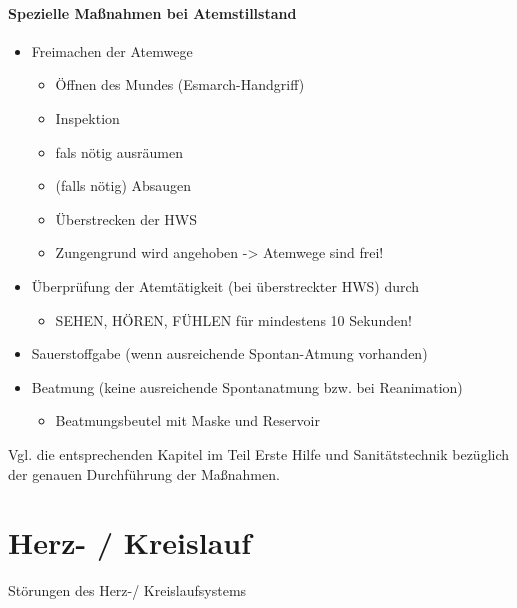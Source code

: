 \begin{gMassnahmenEnv}
    \paragraph{Spezielle Ma{\ss}nahmen bei Atemstillstand}

\begin{itemize}
    \item Freimachen der Atemwege
    \begin{itemize}
        \item \"Offnen des Mundes (Esmarch-Handgriff)
        \item Inspektion
        \item fals n\"otig ausr\"aumen
        \item (falls n\"otig) Absaugen
        \item \"Uberstrecken der HWS
        \item Zungengrund wird angehoben -{\textgreater} Atemwege  sind frei!
    \end{itemize}
    \item \"Uberpr\"ufung der Atemt\"atigkeit (bei  \"uberstreckter HWS)
    durch
    \begin{itemize}
        \item SEHEN, H\"OREN, F\"UHLEN f\"ur mindestens 10  Sekunden!
    \end{itemize}
    \item Sauerstoffgabe (wenn ausreichende Spontan-Atmung vorhanden)
    \item Beatmung (keine ausreichende Spontanatmung bzw. bei Reanimation)
    \begin{itemize}
        \item Beatmungsbeutel mit Maske und Reservoir
    \end{itemize}
\end{itemize}

Vgl. die entsprechenden Kapitel im Teil Erste Hilfe und
Sanit\"atstechnik bez\"uglich der genauen Durchf\"uhrung der
Ma{\ss}nahmen. 
\end{gMassnahmenEnv}









\section[Herz- / Kreislauf]{Herz- / Kreislauf}
\label{bkm:RefHeading42514202}St\"orungen des Herz-/ Kreislaufsystems



